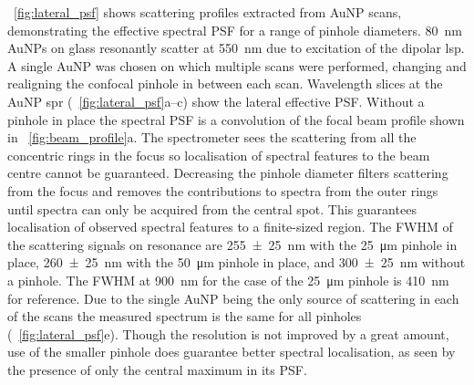 \documentclass{article}
\begin{document}
\figurename~\ref{fig:lateral_psf} shows scattering profiles extracted from AuNP scans, demonstrating the effective spectral PSF for a range of pinhole diameters. \SI{80}{nm} AuNPs on glass resonantly scatter at \SI{550}{nm} due to excitation of the dipolar \gls{lsp}. A single AuNP was chosen on which multiple scans were performed, changing and realigning the confocal pinhole in between each scan. Wavelength slices at the AuNP \gls{spr} (\figurename~\ref{fig:lateral_psf}a--c) show the lateral effective PSF. Without a pinhole in place the spectral PSF is a convolution of the focal beam profile shown in \figurename~\ref{fig:beam_profile}a. The spectrometer sees the scattering from all the concentric rings in the focus so localisation of spectral features to the beam centre cannot be guaranteed. Decreasing the pinhole diameter filters scattering from the focus and removes the contributions to spectra from the outer rings until spectra can only be acquired from the central spot. This guarantees localisation of observed spectral features to a finite-sized region. The FWHM of the scattering signals on resonance are \SI{255\pm25}{nm} with the \SI{25}{\micro\metre} pinhole in place, \SI{260\pm25}{nm} with the \SI{50}{\micro\metre} pinhole in place, and \SI{300\pm25}{nm} without a pinhole.
The FWHM at \SI{900}{nm} for the case of the \SI{25}{\micro\metre} pinhole is \SI{410}{nm} for reference. Due to the single AuNP being the only source of scattering in each of the scans the measured spectrum is the same for all pinholes (\figurename~\ref{fig:lateral_psf}e). Though the resolution is not improved by a great amount, use of the smaller pinhole does guarantee better spectral localisation, as seen by the presence of only the central maximum in its PSF.
\end{document}
